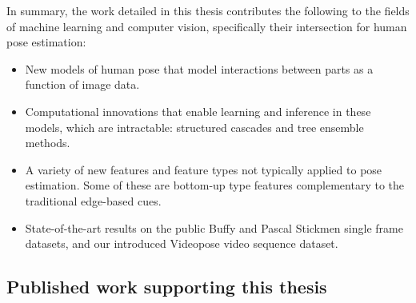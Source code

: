 In summary, the work detailed in this thesis contributes the following to the 
fields of machine learning and computer vision, specifically their intersection 
for human pose estimation:
\begin{itemize}

\item New models of human pose that model interactions between parts as a 
function of image data.

\item Computational innovations that enable learning and inference in these 
models, which are \naively intractable: structured cascades and tree ensemble 
methods.

\item A variety of new features and feature types not typically applied to pose 
estimation.  Some of these are bottom-up type features complementary to the 
traditional edge-based cues.

\item State-of-the-art results on the public Buffy and Pascal Stickmen single 
frame datasets, and our introduced Videopose video sequence dataset.

\end{itemize}


\subsection{Published work supporting this thesis}



